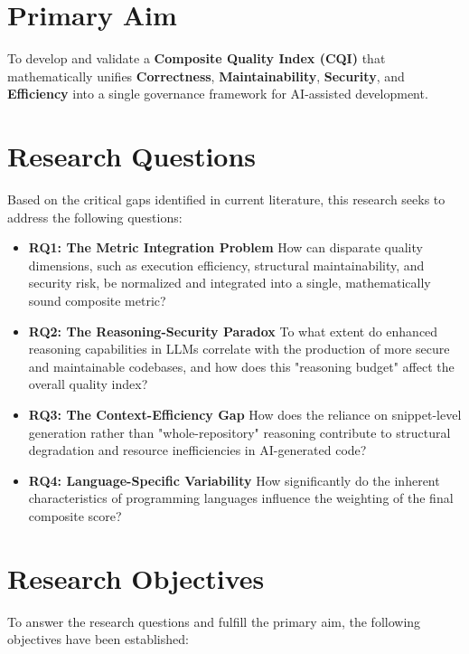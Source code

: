 
\section{Primary Aim}

To develop and validate a \textbf{Composite Quality Index (CQI)} that mathematically unifies \textbf{Correctness}, \textbf{Maintainability}, \textbf{Security}, and \textbf{Efficiency} into a single governance framework for AI-assisted development.

\section{Research Questions}

Based on the critical gaps identified in current literature, this research seeks to address the following questions:

\begin{itemize}
    \item \textbf{RQ1: The Metric Integration Problem} How can disparate quality dimensions, such as execution efficiency, structural maintainability, and security risk, be normalized and integrated into a single, mathematically sound composite metric? 
    \item \textbf{RQ2: The Reasoning-Security Paradox} To what extent do enhanced reasoning capabilities in LLMs correlate with the production of more secure and maintainable codebases, and how does this "reasoning budget" affect the overall quality index? 
    \item \textbf{RQ3: The Context-Efficiency Gap} How does the reliance on snippet-level generation rather than "whole-repository" reasoning contribute to structural degradation and resource inefficiencies in AI-generated code? 
    \item \textbf{RQ4: Language-Specific Variability} How significantly do the inherent characteristics of programming languages influence the weighting of the final composite score? 
\end{itemize}

\section{Research Objectives}

To answer the research questions and fulfill the primary aim, the following objectives have been established:

